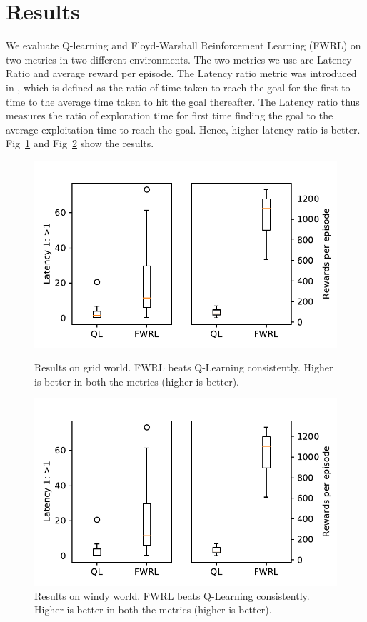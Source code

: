 \section{Results}

We evaluate Q-learning and Floyd-Warshall Reinforcement Learning (FWRL)  on two
metrics in two different environments. The two metrics we use are Latency Ratio
and average reward per episode. The Latency ratio metric was introduced in
\citet{MiPaViICLR2017}, which is defined as the ratio of time taken to reach the
goal for the first to time to the average time taken to hit the goal thereafter.
The Latency ratio thus measures the ratio of exploration time for first time
finding the goal to the average exploitation time to reach the goal. Hence,
higher latency ratio is better.
Fig~\ref{fig:ql-fw-grid-world-results} and
Fig~\ref{fig:ql-fw-windy-world-results} show the results.

\begin{figure}%
\includegraphics[width=\columnwidth]{./media/ql-fw-grid-world.pdf}\\
\caption{Results on grid world. FWRL beats Q-Learning consistently. Higher is
  better in both the metrics (higher is better).}
\label{fig:ql-fw-grid-world-results}%
\end{figure}
\begin{figure}
\includegraphics[width=\columnwidth]{./media/ql-fw-windy-world.pdf}%
\caption{Results on windy world. FWRL beats Q-Learning consistently. Higher is
  better in both the metrics (higher is better).}
\label{fig:ql-fw-windy-world-results}%
\end{figure}
